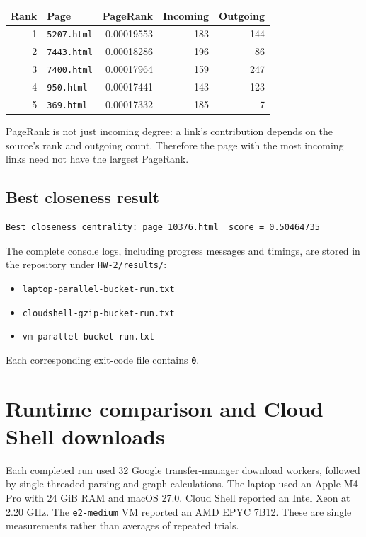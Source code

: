 \documentclass[10pt,letterpaper]{article}
\begin{document}
\begin{center}
\begin{tabular}{@{}rlrrr@{}}
\toprule Rank & Page & PageRank & Incoming & Outgoing \\ \midrule
1 & \texttt{5207.html} & 0.00019553 & 183 & 144 \\
2 & \texttt{7443.html} & 0.00018286 & 196 & 86 \\
3 & \texttt{7400.html} & 0.00017964 & 159 & 247 \\
4 & \texttt{950.html} & 0.00017441 & 143 & 123 \\
5 & \texttt{369.html} & 0.00017332 & 185 & 7 \\
\bottomrule
\end{tabular}
\end{center}
PageRank is not just incoming degree: a link's contribution depends on the
source's rank and outgoing count. Therefore the page with the most incoming
links need not have the largest PageRank.

\subsection{Best closeness result}
\begin{lstlisting}
Best closeness centrality: page 10376.html  score = 0.50464735
\end{lstlisting}
The complete console logs, including progress messages and timings, are stored
in the repository under \texttt{HW-2/results/}:
\begin{itemize}
\item \texttt{laptop-parallel-bucket-run.txt}
\item \texttt{cloudshell-gzip-bucket-run.txt}
\item \texttt{vm-parallel-bucket-run.txt}
\end{itemize}
Each corresponding exit-code file contains \texttt{0}.

\clearpage
\section{Runtime comparison and Cloud Shell downloads}
Each completed run used 32 Google transfer-manager download workers, followed
by single-threaded parsing and graph calculations. The laptop used an Apple
M4 Pro with 24 GiB RAM and macOS 27.0. Cloud Shell reported an Intel Xeon at
2.20 GHz. The \texttt{e2-medium} VM reported an AMD EPYC 7B12. These are single
measurements rather than averages of repeated trials.
\end{document}
